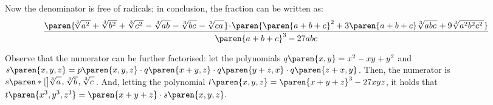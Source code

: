 Now the denominator is free of radicals;
in conclusion, the fraction can be written as:
\begin{equation*}
  \frac{\paren{ \!
          \sqrt[3]{a^2 \vphantom{b^2 c^2} \mspace{2mu}}
          + \sqrt[3]{b^2 \vphantom{a^2 c^2} \mspace{2mu}}
          + \sqrt[3]{c^2 \vphantom{a^2 b^2} \mspace{2mu}}
          - \sqrt[3]{a b \vphantom{c} \mspace{2mu}}
          - \sqrt[3]{b c \vphantom{a} \mspace{2mu}}
          - \sqrt[3]{c a \vphantom{b} \mspace{2mu}}
        } \! \cdot \!
        \paren{
          \paren{a + b + c}^2
          + 3 \paren{a + b + c} \sqrt[3]{a b c \mspace{2mu}}
          + 9 \sqrt[3]{a^2 b^2 c^2 \mspace{2mu}}
        }}
       {\mspace{1mu} \paren{a + b + c}^3 - 27 a b c \mspace{1mu}}
\end{equation*}

Observe that the numerator can be further factorised:
let the polynomials $q\paren{x, y} = x^2 - x y + y^2$ and
$s\paren{x, y, z} =
 p\paren{x, y, z}
 \cdot q\paren{x + y, z} \cdot q\paren{y + z, x} \cdot q\paren{z + x, y}$.
Then, the numerator is
$s\paren*[\big]{\mspace{-2mu}
                \sqrt[3]{a \vphantom{b c} \mspace{2mu}}, \mspace{1mu}
                \sqrt[3]{b \vphantom{c a} \mspace{2mu}}, \mspace{1mu}
                \sqrt[3]{c \vphantom{a b} \mspace{2mu}} \mspace{1mu}}$.
And, letting the polynomial
$t\paren{x, y, z} = \paren{x + y + z}^3 - 27 x y z$,
it holds that
$t\paren{x^3, y^3, z^3} = \paren{x + y + z} \cdot s\paren{x, y, z}$.
